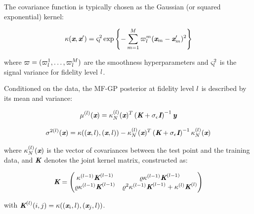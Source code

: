 The covariance function is typically chosen as the Gaussian (or squared exponential) kernel:

\begin{equation} \label{eq:kernelfunc}
	\kappa(\textbf{\em x}, \textbf{\em x}') = \varsigma^2_{l} \exp \left\{ - \sum_{m=1}^{M} \varpi^m_{l} (\textbf{\em x}_m - \textbf{\em x}_m')^2 \right\}
\end{equation}

\noindent where $\varpi = (\varpi^1_{l}, \ldots, \varpi^M_{l})$ are the smoothness hyperparameters and $\varsigma^2_{l}$ is the signal variance for fidelity level $l$.

Conditioned on the data, the MF-GP posterior at fidelity level $l$ is described by its mean and variance:

\begin{equation}\label{e:MFGP2}
	\mu^{(l)} (\textbf{\em x}) = \kappa_N^{(l)}(\textbf{\em x})^T \left(\textbf{\em K} + \sigma_{\epsilon} \textbf{\em I} \right)^{-1} \textbf{\em y}
\end{equation}

\begin{equation}\label{e:MFGP3}
	\sigma^{2(l)} (\textbf{\em x}) = \kappa((\textbf{\em x}, l), (\textbf{\em x}, l)) - \kappa_N^{(l)}(\textbf{\em x})^T \left(\textbf{\em K} + \sigma_{\epsilon} \textbf{\em I} \right)^{-1} \kappa_N^{(l)}(\textbf{\em x})
\end{equation}

\noindent where $\kappa_N^{(l)}(\textbf{\em x})$ is the vector of covariances between the test point and the training data, and $\textbf{\em K}$ denotes the joint kernel matrix, constructed as:

\begin{equation} \label{e:MFGP4}
	\textbf{\em K} = \begin{pmatrix}
		\kappa^{(l-1)} \textbf{\em K}^{(l-1)}           & \varrho \kappa^{(l-1)} \textbf{\em K}^{(l-1)}                                                     \\
		\varrho \kappa^{(l-1)} \textbf{\em K}^{(l-1)} & \varrho^2 \kappa^{(l-1)} \textbf{\em K}^{(l-1)} + \kappa^{(l)} \textbf{\em K}^{(l)}
	\end{pmatrix}
\end{equation}

\noindent with $\textbf{\em K}^{(l)}(i,j) = \kappa((\textbf{\em x}_i, l), (\textbf{\em x}_j, l))$.

